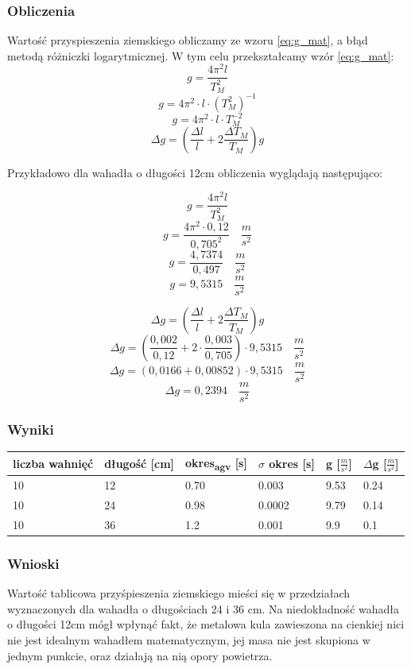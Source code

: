 \documentclass[a4paper, 11pt]{article}
\begin{document}
\subsubsection{Obliczenia}
Wartość przyspieszenia ziemskiego obliczamy ze wzoru \eqref{eq:g_mat},
a błąd metodą różniczki logarytmicznej.
W tym celu przekształcamy wzór \eqref{eq:g_mat}:
\[
	g = \frac{4\pi^2l}{T^2_M}
\]
\[
	g = 4\pi^2 \cdot l \cdot\left(T^2_M\right)^{-1}
\]
\[
	g = 4\pi^2\cdot l \cdot T^{-2}_M
\]
\begin{equation}
	\Delta g = \left( \frac{\Delta l}{l} +2\frac{\Delta T_M}{T_M} \right)g
\end{equation}

Przykładowo dla wahadła o długości 12cm obliczenia wyglądają następująco:
\begin{multicols}{2}
	\[
		g = \frac{4\pi^2l}{T^2_M}
	\]
	\[
		g = \frac{4\pi^2 \cdot 0,12}{0,705^2} \quad\frac{m}{s^2}
	\]
	\[
		g = \frac{4,7374}{0,497} \quad\frac{m}{s^2}
	\]
	\[
		g = 9,5315 \quad\frac{m}{s^2}
	\]

	\columnbreak

	\[
		\Delta g = \left( \frac{\Delta l}{l} +2\frac{\Delta T_M}{T_M} \right)g
	\]
	\[
		\Delta g = \left( \frac{0,002}{0,12} +2 \cdot \frac{0,003}{0,705} \right) \cdot 9,5315 \quad \frac{m}{s^2}
	\]
	\[
		\Delta g = \left( 0,0166 + 0,00852 \right) \cdot 9,5315 \quad \frac{m}{s^2}
	\]
	\[
		\Delta g = 0,2394 \quad \frac{m}{s^2}
	\]
\end{multicols}

\subsubsection{Wyniki}
\begin{center}
	\begin{tabular}{|l|l|l|l|l|l|}
		\hline
		liczba wahnięć & długość [cm] & okres\textsubscript{agv} [s] & $\sigma$ okres [s] & g [$\frac{m}{s^2}$] & $\Delta$g [$\frac{m}{s^2}$] \\ \hline
		10             & 12           & 0.70                         & 0.003              & 9.53                & 0.24                        \\ \hline
		10             & 24           & 0.98                         & 0.0002             & 9.79                & 0.14                        \\ \hline
		10             & 36           & 1.2                          & 0.001              & 9.9                 & 0.1                         \\ \hline
	\end{tabular}
\end{center}

\subsubsection{Wnioski}
Wartość tablicowa przyśpieszenia ziemskiego mieści się w przedziałach wyznaczonych dla wahadła o długościach 24 i 36 cm.
Na niedokładność wahadła o długości 12cm mógł wpłynąć fakt, że metalowa kula zawieszona na cienkiej nici nie jest idealnym wahadłem matematycznym,
jej masa nie jest skupiona w jednym punkcie, oraz działają na nią opory powietrza.
\end{document}
